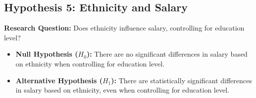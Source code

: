 \subsection{Hypothesis 5: Ethnicity and Salary}
\textbf{Research Question:} Does ethnicity influence salary, controlling for education level?

\begin{itemize}
    \item \textbf{Null Hypothesis ($H_0$):} There are no significant differences in salary based on ethnicity when controlling for education level.
    \item \textbf{Alternative Hypothesis ($H_1$):} There are statistically significant differences in salary based on ethnicity, even when controlling for education level.
\end{itemize}
